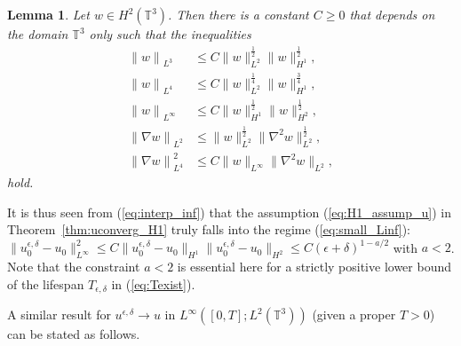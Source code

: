\documentclass[reqno,10pt]{amsart}
\newtheorem{lemma}[theorem]{Lemma}
\theoremstyle{definition}
\theoremstyle{remark}
\numberwithin{equation}{section}
\begin{document}
\begin{lemma} \label{lem:interp_ineq}
    Let  $w\in H^2(\mathbb T^3)$. Then there is a constant $C\ge 0$ that depends on the domain $\mathbb T^3$ only such that the inequalities 
    \begin{subequations}
    \begin{align}
        {\|w\|}_{L^3} &\le C \|w\|_{L^2}^{\frac{1}{2}} \|w\|_{H^1}^{\frac{1}{2}}, \label{eq:interp_L3} \\
        {\|w\|}_{L^4} &\le C \|w\|_{L^2}^{\frac{1}{4}} \| w\|_{H^1}^{\frac{3}{4}}, \\
        {\|w\|}_{L^\infty} &\le C \|w\|_{H^1}^{\frac{1}{2}} \|w\|_{H^2}^{\frac{1}{2}}, \label{eq:interp_inf}\\
        {\|\nabla w\|}_{L^2} &\le \|w\|_{L^2}^{\frac{1}{2}} \|\nabla^2 w\|_{L^2}^{\frac{1}{2}}, \label{eq:interp_nabla_L2} \\
        {\|\nabla w\|}_{L^4}^2 &\le C\|w\|_{L^\infty} \|\nabla^2 w\|_{L^2}, \label{eq:interp_d}
    \end{align}
    \end{subequations}
   hold.
\end{lemma}

It is thus seen from (\ref{eq:interp_inf}) that the assumption (\ref{eq:H1_assump_u}) in Theorem~\ref{thm:uconverg_H1} truly falls into the regime (\ref{eq:small_Linf}):  $\|u^{\epsilon,\delta}_0-u_0\|_{L^\infty}^2\le C\|u^{\epsilon,\delta}_0-u_0\|_{H^1} \|u^{\epsilon,\delta}_0-u_0\|_{H^2}\le C(\epsilon+\delta)^{1-a/2}$ with $a<2$.
Note that the constraint $a<2$ is essential here for a strictly positive lower bound of the lifespan $T_{\epsilon,\delta}$ in (\ref{eq:Texist}).

A similar result for $u^{\epsilon,\delta}\to u$ in $L^\infty([0,T];L^2(\mathbb T^3))$ (given a proper $T>0$) can be stated as follows.
\end{document}
